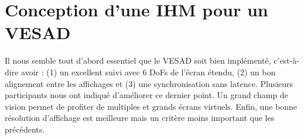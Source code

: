 





\section{Conception d'une IHM pour un VESAD}
\label{sec:discussion_consequences}

Il nous semble tout d'abord essentiel que le VESAD soit bien implémenté, c'est-à-dire avoir : (1) un excellent suivi avec 6 DoFs de l'écran étendu, (2) un bon alignement entre les affichages et (3) une synchronisation sans latence. Plusieurs participants nous ont indiqué d'améliorer ce dernier point. Un grand champ de vision permet de profiter de multiples et grands écrans virtuels. Enfin, une bonne résolution d'affichage est meilleure mais un critère moins important que les précédents.

